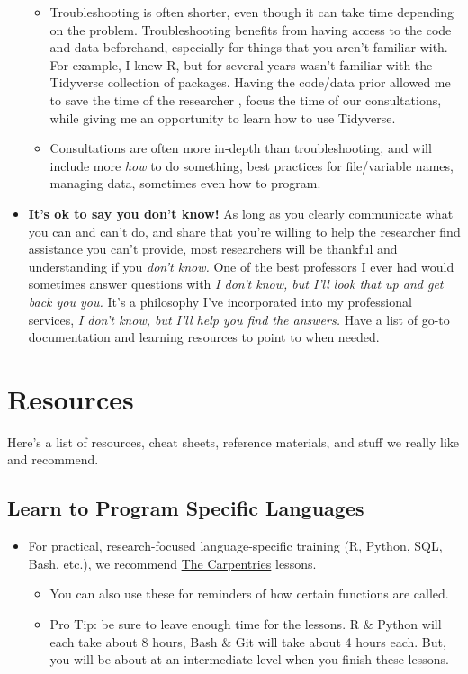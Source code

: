\documentclass[
]{book}
\providecommand{\tightlist}{%
  \setlength{\itemsep}{0pt}\setlength{\parskip}{0pt}}
\begin{document}
\begin{itemize}
  \begin{itemize}
  \tightlist
  \item
    Troubleshooting is often shorter, even though
    it can take time depending on the problem. Troubleshooting benefits from having
    access to the code and data beforehand, especially for things that you aren't
    familiar with. For example, I knew R, but for several years wasn't familiar
    with the Tidyverse collection of packages. Having the code/data prior allowed me
    to save the time of the researcher \citep{wikipediaFiveLaws}, focus the time of our
    consultations, while
    giving me an opportunity to learn how to use Tidyverse.
  \item
    Consultations are often more in-depth than troubleshooting, and will include
    more \emph{how} to do something, best practices for file/variable names, managing
    data, sometimes even how to program.
  \end{itemize}
\item
  \textbf{It's ok to say you don't know!} As long as you clearly communicate what
  you can and can't do, and share that you're willing to help the researcher find
  assistance you can't provide, most researchers will be thankful and
  understanding if you \emph{don't know.} One of the best professors I ever had would
  sometimes answer questions with \emph{I don't know, but I'll look that up and get back
  you you.} It's a philosophy I've incorporated into my professional services,
  \emph{I don't know, but I'll help you find the answers.} Have a list of go-to documentation and learning resources to point to when needed.
\end{itemize}

\chapter{Resources}\label{resources}

Here's a list of resources, cheat sheets, reference materials, and stuff we really like and recommend.

\section{Learn to Program Specific Languages}\label{learn-to-program-specific-languages}

\begin{itemize}
\tightlist
\item
  For practical, research-focused language-specific training (R, Python, SQL, Bash, etc.), we recommend \href{https://carpentries.org/lessons/}{The Carpentries} lessons.

  \begin{itemize}
  \tightlist
  \item
    You can also use these for reminders of how certain functions are called.
  \item
    Pro Tip: be sure to leave enough time for the lessons. R \& Python will each take
    about 8 hours, Bash \& Git will take about 4 hours each. But, you will be about
    at an intermediate level when you finish these lessons.
  \end{itemize}
\end{itemize}
\end{document}
